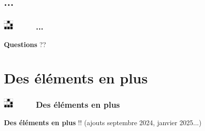 \documentclass[slidetop,11pt]{beamer}
\def\sectionPartIVe{...}
\def\sectionPartV{Des {\'e}l{\'e}ments en plus}
\def\moreInFrameTitle{\includegraphics[height=0.5cm]{img/logo_glider.png}~~~~~}
\begin{document}
\subsection{\sectionPartIVe}
\begin{frame}
	\frametitle{\moreInFrameTitle \sectionPartIVe}
	{\centering \textbf{Questions} ?? }
\end{frame} 

\section{\sectionPartV}
\begin{frame}
	\frametitle{\moreInFrameTitle \sectionPartV}
	{\centering \textbf{Des {\'e}l{\'e}ments en plus} !! (ajouts septembre 2024, janvier 2025...) }
\end{frame} 
\end{document}
